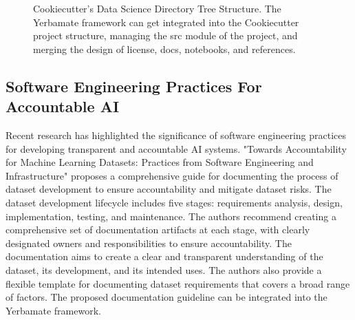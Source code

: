 \begin{figure}
    \centering
    \caption{Cookiecutter's Data Science Directory Tree Structure.
    The Yerbamate framework can get integrated into the Cookiecutter project structure, managing the src module of the project, and merging the design of license, docs, notebooks, and references. 
    }
    \label{fig:directory-tree}
\end{figure}



\subsection{Software Engineering Practices For Accountable AI}

Recent research has highlighted the significance of software engineering practices for developing transparent and accountable AI systems. "Towards Accountability for Machine Learning Datasets: Practices from Software Engineering and Infrastructure"\cite{accountabilityInAi} proposes a comprehensive guide for documenting the process of dataset development to ensure accountability and mitigate dataset risks. The dataset development lifecycle includes five stages: requirements analysis, design, implementation, testing, and maintenance. The authors recommend creating a comprehensive set of documentation artifacts at each stage, with clearly designated owners and responsibilities to ensure accountability. The documentation aims to create a clear and transparent understanding of the dataset, its development, and its intended uses. The authors also provide a flexible template for documenting dataset requirements that covers a broad range of factors. The proposed documentation guideline can be integrated into the Yerbamate framework.

